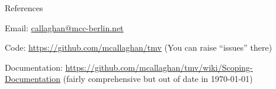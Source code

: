 \documentclass[9pt]{beamer}
\begin{document}
\begin{frame}{References}

\scriptsize

Email: \url{callaghan@mcc-berlin.net}

Code: \url{https://github.com/mcallaghan/tmv} (You can raise ``issues'' there)

\medskip

Documentation: \url{https://github.com/mcallaghan/tmv/wiki/Scoping-Documentation} (fairly comprehensive but out of date in \today)

\medskip


\end{frame}
\end{document}
